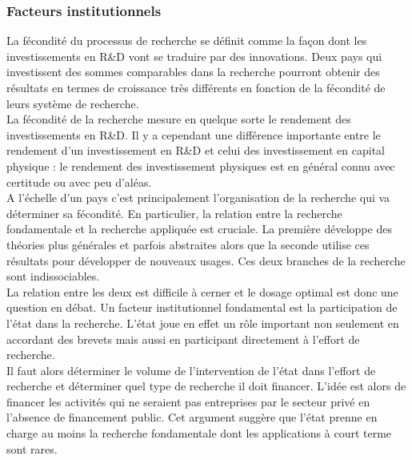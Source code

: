 \documentclass[10pt]{book}
\begin{document}
\subsubsection{Facteurs institutionnels}
La fécondité du processus de recherche se définit comme la façon dont les investissements en R\&D vont se traduire par des innovations. Deux pays qui investissent des sommes comparables dans la recherche pourront obtenir des résultats en termes de croissance très différents en fonction de la fécondité de leurs système de recherche. \\
La fécondité de la recherche mesure en quelque sorte le rendement des investissements en R\&D. Il y a cependant une différence importante entre le rendement d'un investissement en R\&D et celui des investissement en capital physique : le rendement des investissement physiques est en général connu avec certitude ou avec peu d'aléas. \\
A l'échelle d'un pays c'est principalement l'organisation de la recherche qui va déterminer sa fécondité. En particulier, la relation entre la recherche fondamentale et la recherche appliquée est cruciale. La première développe des théories plus générales et parfois abstraites alors que la seconde utilise ces résultats pour développer de nouveaux usages. Ces deux branches de la recherche sont indissociables. \\
La relation entre les deux est difficile à cerner et le dosage optimal est donc une question en débat. Un facteur institutionnel fondamental est la participation de l'état dans la recherche. L'état joue en effet un rôle important non seulement en accordant des brevets mais aussi en participant directement à l'effort de recherche.\\
Il faut alors déterminer le volume de l'intervention de l'état dans l'effort de recherche et déterminer quel type de recherche il doit financer. L'idée est alors de financer les activités qui ne seraient pas entreprises par le secteur privé en l'absence de financement public. Cet argument suggère que l'état prenne en charge au moins la recherche fondamentale dont les applications à court terme sont rares.
\end{document}
